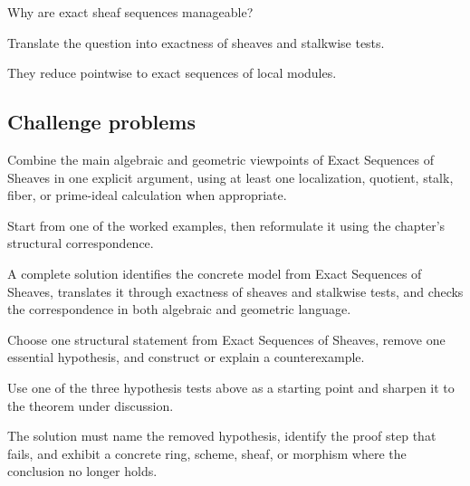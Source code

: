 \begin{exercise}\label{exr:vi16-expand-14}
Why are exact sheaf sequences manageable?
\end{exercise}
\begin{hint}
Translate the question into exactness of sheaves and stalkwise tests.
\end{hint}
\begin{solution}
They reduce pointwise to exact sequences of local modules.
\end{solution}

\subsection*{Challenge problems}

\begin{exercise}\label{exr:vi16-expand-15}
Combine the main algebraic and geometric viewpoints of Exact Sequences of Sheaves in one explicit argument, using at least one localization, quotient, stalk, fiber, or prime-ideal calculation when appropriate.
\end{exercise}
\begin{hint}
Start from one of the worked examples, then reformulate it using the chapter's structural correspondence.
\end{hint}
\begin{solution}
A complete solution identifies the concrete model from Exact Sequences of Sheaves, translates it through exactness of sheaves and stalkwise tests, and checks the correspondence in both algebraic and geometric language.
\end{solution}

\begin{exercise}\label{exr:vi16-expand-16}
Choose one structural statement from Exact Sequences of Sheaves, remove one essential hypothesis, and construct or explain a counterexample.
\end{exercise}
\begin{hint}
Use one of the three hypothesis tests above as a starting point and sharpen it to the theorem under discussion.
\end{hint}
\begin{solution}
The solution must name the removed hypothesis, identify the proof step that fails, and exhibit a concrete ring, scheme, sheaf, or morphism where the conclusion no longer holds.
\end{solution}

